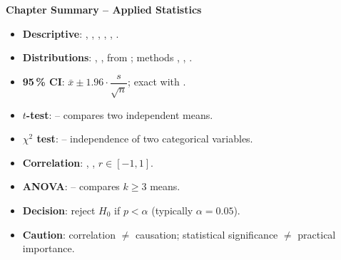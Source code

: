 \begin{keyformulas}
\textbf{Chapter Summary -- Applied Statistics}
\begin{itemize}
    \item \textbf{Descriptive}: , , , , , .
    \item \textbf{Distributions}: , ,  from ; methods , , .
    \item \textbf{95\,\% CI}: $\bar{x} \pm 1.96 \cdot \dfrac{s}{\sqrt{n}}$; exact with .
    \item \textbf{$t$-test}:  -- compares two independent means.
    \item \textbf{$\chi^2$ test}:  -- independence of two categorical variables.
    \item \textbf{Correlation}: , , $r \in [-1, 1]$.
    \item \textbf{ANOVA}:  -- compares $k \geq 3$ means.
    \item \textbf{Decision}: reject $H_0$ if $p < \alpha$ (typically $\alpha = 0.05$).
    \item \textbf{Caution}: correlation $\neq$ causation; statistical significance $\neq$ practical importance.
\end{itemize}
\end{keyformulas}
